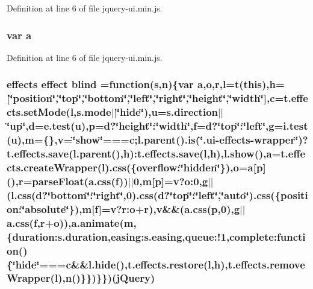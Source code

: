 {{Definition at line 6 of file jquery-\/ui.\+min.\+js.

\subsubsection[{\texorpdfstring{a}{a}}]{\setlength{\rightskip}{0pt plus 5cm}var a}\hypertarget{jquery-ui_8min_8js_a82ca4ee5dd63e58a2bb967077dc8b8fb}{}\label{jquery-ui_8min_8js_a82ca4ee5dd63e58a2bb967077dc8b8fb}


Definition at line 6 of file jquery-\/ui.\+min.\+js.

\subsubsection[{\texorpdfstring{blind}{blind}}]{ {\bf effects} effect blind =function({\bf s},{\bf n})\{var {\bf a},{\bf o},{\bf r},{\bf l}={\bf t}({\bf this}),{\bf h}=\mbox{[}\char`\"{}position\char`\"{},\char`\"{}top\char`\"{},\char`\"{}bottom\char`\"{},\char`\"{}left\char`\"{},\char`\"{}right\char`\"{},\char`\"{}{\bf height}\char`\"{},\char`\"{}width\char`\"{}\mbox{]},c=t.\+effects.\+set\+Mode({\bf l},s.\+mode$\vert$$\vert$\char`\"{}hide\char`\"{}),u=s.\+direction$\vert$$\vert$\char`\"{}up\char`\"{},d=e.\+test({\bf u}),{\bf p}={\bf d}?\char`\"{}height\char`\"{}\+:\char`\"{}width\char`\"{},f={\bf d}?\char`\"{}top\char`\"{}\+:\char`\"{}left\char`\"{},g=i.\+test({\bf u}),{\bf m}=\{\},{\bf v}=\char`\"{}show\char`\"{}===c;l.\+parent().is(\char`\"{}.ui-\/{\bf effects}-\/wrapper\char`\"{})?t.\+effects.\+save(l.\+parent(),{\bf h})\+:t.\+effects.\+save({\bf l},{\bf h}),l.\+show(),{\bf a}=t.\+effects.\+create\+Wrapper({\bf l}).css(\{overflow\+:\char`\"{}hidden\char`\"{}\}),o={\bf a}\mbox{[}{\bf p}\mbox{]}(),{\bf r}=parse\+Float(a.\+css({\bf f}))$\vert$$\vert$0,{\bf m}\mbox{[}{\bf p}\mbox{]}={\bf v}?o\+:0,{\bf g}$\vert$$\vert$(l.\+css({\bf d}?\char`\"{}bottom\char`\"{}\+:\char`\"{}right\char`\"{},0).css({\bf d}?\char`\"{}top\char`\"{}\+:\char`\"{}left\char`\"{},\char`\"{}auto\char`\"{}).css(\{position\+:\char`\"{}absolute\char`\"{}\}),m\mbox{[}{\bf f}\mbox{]}={\bf v}?r\+:o+{\bf r}),{\bf v}\&\&(a.\+css({\bf p},0),{\bf g}$\vert$$\vert$a.\+css({\bf f},{\bf r}+{\bf o})),a.\+animate({\bf m},\{duration\+:s.\+duration,easing\+:s.\+easing,queue\+:!1,complete\+:function()\{\char`\"{}hide\char`\"{}===c\&\&l.\+hide(),t.\+effects.\+restore({\bf l},{\bf h}),t.\+effects.\+remove\+Wrapper({\bf l}),{\bf n}()\}\})\}\})({\bf j\+Query})}\hypertarget{jquery-ui_8min_8js_a0da7e8abb9ae30301c716032e1fa9f37}{}\label{jquery-ui_8min_8js_a0da7e8abb9ae30301c716032e1fa9f37}


}}

